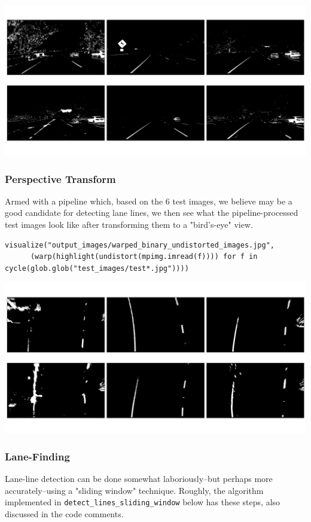 \documentclass[11pt]{article}
\begin{document}
\includegraphics[width=.9\linewidth]{output_images/binary_undistorted_test_images.jpg}

\subsubsection*{Perspective Transform}
\label{sec-2-2-5}

Armed with a pipeline which, based on the 6 test images, we
believe may be a good candidate for detecting lane lines, we
then see what the pipeline-processed test images look like after
transforming them to a "bird's-eye" view.

\begin{verbatim}
visualize("output_images/warped_binary_undistorted_images.jpg",
	  (warp(highlight(undistort(mpimg.imread(f)))) for f in cycle(glob.glob("test_images/test*.jpg"))))
\end{verbatim}

\includegraphics[width=.9\linewidth]{output_images/warped_binary_undistorted_images.jpg}

\subsubsection*{Lane-Finding}
\label{sec-2-2-6}

Lane-line detection can be done somewhat laboriously--but
perhaps more accurately--using a "sliding window" technique.
Roughly, the algorithm implemented in
\texttt{detect\_lines\_sliding\_window} below has these steps, also
discussed in the code comments.
\end{document}
